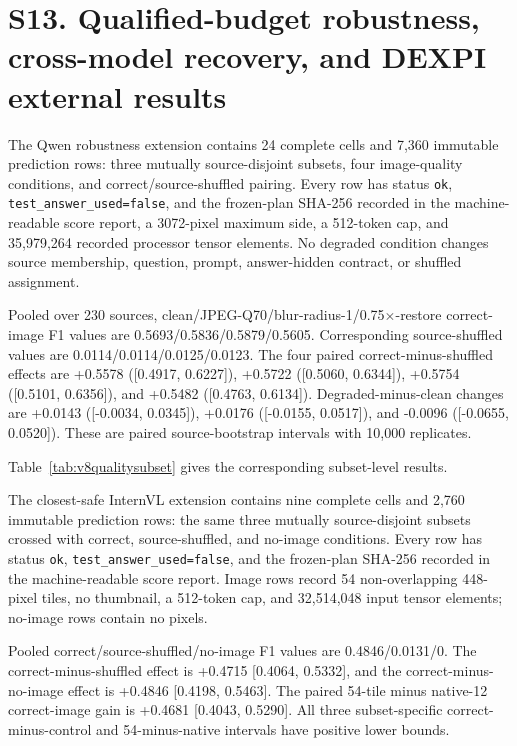 \documentclass[11pt]{article}
\begin{document}
\section*{S13. Qualified-budget robustness, cross-model recovery, and DEXPI external results}

The Qwen robustness extension contains 24 complete cells and 7,360 immutable
prediction rows: three mutually source-disjoint subsets, four image-quality
conditions, and correct/source-shuffled pairing. Every row has status
\texttt{ok}, \texttt{test\_answer\_used=false}, and the frozen-plan SHA-256
recorded in the machine-readable score report,
a 3072-pixel maximum side, a 512-token cap, and 35,979,264 recorded processor
tensor elements. No degraded condition changes source membership, question,
prompt, answer-hidden contract, or shuffled assignment.

Pooled over 230 sources, clean/JPEG-Q70/blur-radius-1/0.75$\times$-restore
correct-image F1 values are 0.5693/0.5836/0.5879/0.5605. Corresponding
source-shuffled values are 0.0114/0.0114/0.0125/0.0123. The four paired
correct-minus-shuffled effects are +0.5578 ([0.4917, 0.6227]), +0.5722
([0.5060, 0.6344]), +0.5754 ([0.5101, 0.6356]), and +0.5482 ([0.4763,
0.6134]). Degraded-minus-clean changes are +0.0143 ([-0.0034, 0.0345]),
+0.0176 ([-0.0155, 0.0517]), and -0.0096 ([-0.0655, 0.0520]). These are
paired source-bootstrap intervals with 10,000 replicates.

Table~\ref{tab:v8qualitysubset} gives the corresponding subset-level results.



The closest-safe InternVL extension contains nine complete cells and 2,760
immutable prediction rows: the same three mutually source-disjoint subsets
crossed with correct, source-shuffled, and no-image conditions. Every row has
status \texttt{ok}, \texttt{test\_answer\_used=false}, and the frozen-plan
SHA-256 recorded in the machine-readable score report.
Image rows record 54 non-overlapping 448-pixel tiles, no thumbnail, a 512-token
cap, and 32,514,048 input tensor elements; no-image rows contain no pixels.

Pooled correct/source-shuffled/no-image F1 values are 0.4846/0.0131/0. The
correct-minus-shuffled effect is +0.4715 [0.4064, 0.5332], and the
correct-minus-no-image effect is +0.4846 [0.4198, 0.5463]. The paired 54-tile
minus native-12 correct-image gain is +0.4681 [0.4043, 0.5290]. All three
subset-specific correct-minus-control and 54-minus-native intervals have
positive lower bounds.
\end{document}
